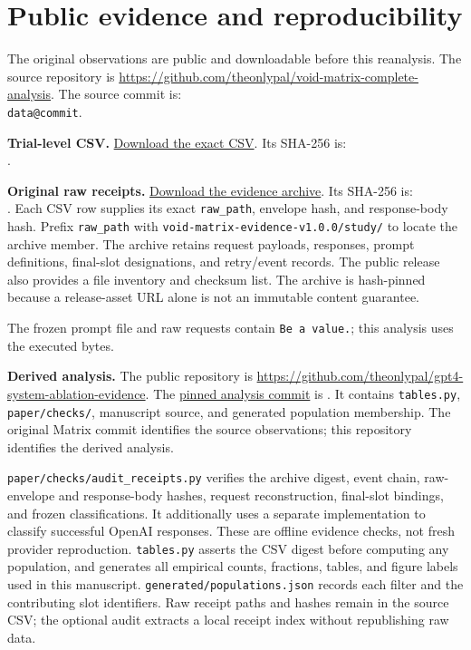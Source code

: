 \documentclass[11pt]{article}
\makeatletter
\newcommand{\D}[1]{\csname data@#1\endcsname}
\makeatother
\begin{document}


\clearpage
\appendix
\section{Public evidence and reproducibility}\label{app:provenance}
The original observations are public and downloadable before this reanalysis. The source repository is \url{https://github.com/theonlypal/void-matrix-complete-analysis}. The source commit is:\\
\texttt{\D{commit}}.

\textbf{Trial-level CSV.} \href{https://raw.githubusercontent.com/theonlypal/void-matrix-complete-analysis/3fd330869c1a4a410047bc70b3f661f1a9d69aca/analysis/tables/trial_level.csv}{Download the exact CSV}. Its SHA-256 is:\\
.

\textbf{Original raw receipts.} \href{https://github.com/theonlypal/void-matrix-complete-analysis/releases/download/v1.0.0-evidence-analysis/void-matrix-evidence-v1.0.0.zip}{Download the evidence archive}. Its SHA-256 is:\\
.
Each CSV row supplies its exact \texttt{raw\_path}, envelope hash, and response-body hash. Prefix \texttt{raw\_path} with \texttt{void-matrix-evidence-v1.0.0/study/} to locate the archive member. The archive retains request payloads, responses, prompt definitions, final-slot designations, and retry/event records. The public release also provides a file inventory and checksum list. The archive is hash-pinned because a release-asset URL alone is not an immutable content guarantee.

The frozen prompt file and raw requests contain \texttt{Be a value.}; this analysis uses the executed bytes.

\textbf{Derived analysis.} The public repository is \url{https://github.com/theonlypal/gpt4-system-ablation-evidence}. The \href{https://github.com/theonlypal/gpt4-system-ablation-evidence/tree/32897d3487591533ef4cb441c66f5cbf2b843b4e}{pinned analysis commit} is . It contains \texttt{tables.py}, \texttt{paper/checks/}, manuscript source, and generated population membership. The original Matrix commit identifies the source observations; this repository identifies the derived analysis.

\texttt{paper/checks/audit\_receipts.py} verifies the archive digest, event chain, raw-envelope and response-body hashes, request reconstruction, final-slot bindings, and frozen classifications. It additionally uses a separate implementation to classify successful OpenAI responses. These are offline evidence checks, not fresh provider reproduction. \texttt{tables.py} asserts the CSV digest before computing any population, and generates all empirical counts, fractions, tables, and figure labels used in this manuscript. \texttt{generated/populations.json} records each filter and the contributing slot identifiers. Raw receipt paths and hashes remain in the source CSV; the optional audit extracts a local receipt index without republishing raw data.
\end{document}
